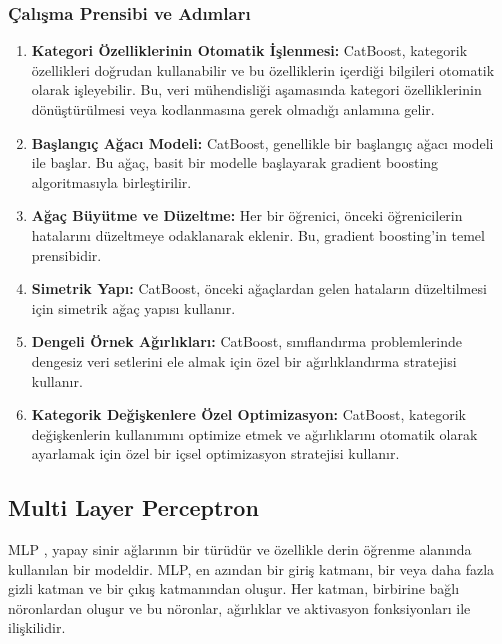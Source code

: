 \subsubsection{Çalışma Prensibi ve Adımları}
\begin{enumerate}
\item \textbf{Kategori Özelliklerinin Otomatik İşlenmesi:} CatBoost, kategorik özellikleri doğrudan kullanabilir ve bu özelliklerin içerdiği bilgileri otomatik olarak işleyebilir. Bu, veri mühendisliği aşamasında kategori özelliklerinin dönüştürülmesi veya kodlanmasına gerek olmadığı anlamına gelir.
\item \textbf{Başlangıç Ağacı Modeli:} CatBoost, genellikle bir başlangıç ağacı modeli ile başlar. Bu ağaç, basit bir modelle başlayarak gradient boosting algoritmasıyla birleştirilir.
\item \textbf{Ağaç Büyütme ve Düzeltme:} Her bir öğrenici, önceki öğrenicilerin hatalarını düzeltmeye odaklanarak eklenir. Bu, gradient boosting'in temel prensibidir.
\item \textbf{Simetrik Yapı:} CatBoost, önceki ağaçlardan gelen hataların düzeltilmesi için simetrik ağaç yapısı kullanır.
\item \textbf{Dengeli Örnek Ağırlıkları:} CatBoost, sınıflandırma problemlerinde dengesiz veri setlerini ele almak için özel bir ağırlıklandırma stratejisi kullanır.
\item \textbf{Kategorik Değişkenlere Özel Optimizasyon:} CatBoost, kategorik değişkenlerin kullanımını optimize etmek ve ağırlıklarını otomatik olarak ayarlamak için özel bir içsel optimizasyon stratejisi kullanır.
\end{enumerate}

\subsection{Multi Layer Perceptron}
MLP , yapay sinir ağlarının bir türüdür ve özellikle derin öğrenme alanında kullanılan bir modeldir. MLP, en azından bir giriş katmanı, bir veya daha fazla gizli katman ve bir çıkış katmanından oluşur. Her katman, birbirine bağlı nöronlardan oluşur ve bu nöronlar, ağırlıklar ve aktivasyon fonksiyonları ile ilişkilidir.

